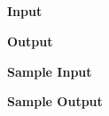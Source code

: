 \subsection{}

\begin{flushleft}
{\color{red} \textbf{Input}}
\end{flushleft}

\begin{flushleft}
{\color{red} \textbf{Output}}
\end{flushleft}

\begin{flushleft}
{\color{red} \textbf{Sample Input}}
\end{flushleft}
\begin{flushleft}
\end{flushleft}

\begin{flushleft}
{\color{red} \textbf{Sample Output}}
\end{flushleft}
\begin{flushleft}
\end{flushleft}

\newpage